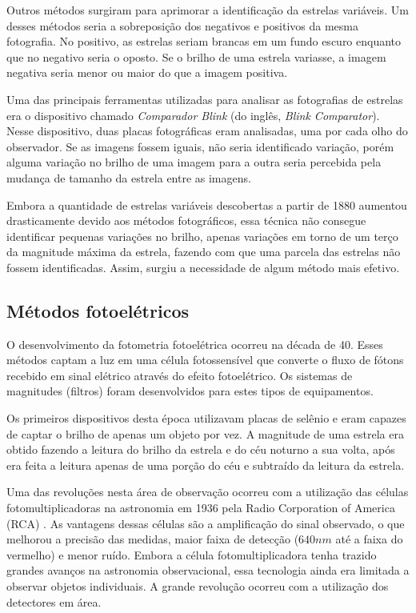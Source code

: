 Outros métodos surgiram para aprimorar a identificação da estrelas variáveis. Um desses métodos seria a sobreposição dos negativos e positivos da mesma fotografia. No positivo, as estrelas seriam brancas em um fundo escuro enquanto que no negativo seria o oposto. Se o brilho de uma estrela variasse, a imagem negativa seria menor ou maior do que a imagem positiva. 

Uma das principais ferramentas utilizadas para analisar as fotografias de estrelas era o dispositivo chamado \textit{Comparador Blink} (do inglês, \textit{Blink Comparator}). Nesse dispositivo, duas placas fotográficas eram analisadas, uma por cada olho do observador. Se as imagens fossem iguais, não seria identificado variação, porém alguma variação no brilho de uma imagem para a outra seria percebida pela mudança de tamanho da estrela entre as imagens.

Embora a quantidade de estrelas variáveis descobertas a partir de 1880 aumentou drasticamente devido aos métodos fotográficos, essa técnica não consegue identificar pequenas variações no brilho, apenas variações em torno de um terço da magnitude máxima da estrela, fazendo com que uma parcela das estrelas não fossem identificadas. Assim, surgiu a necessidade de algum método mais efetivo.


\subsection{Métodos fotoelétricos}

O desenvolvimento da fotometria fotoelétrica ocorreu na década de 40. Esses métodos captam a luz em uma célula fotossensível que converte o fluxo de fótons recebido em sinal elétrico através do efeito fotoelétrico. Os sistemas de magnitudes (filtros) foram desenvolvidos para estes tipos de equipamentos.

Os primeiros dispositivos  desta época utilizavam placas de selênio e eram capazes de captar o brilho de apenas um objeto por vez. A magnitude de uma estrela era obtido fazendo a leitura do brilho da estrela e do céu noturno a sua volta, após era feita a leitura apenas de uma porção do céu e subtraído da leitura da estrela. 

Uma das revoluções nesta área de observação ocorreu com a utilização das células fotomultiplicadoras na astronomia em 1936 pela Radio Corporation of America (RCA) \citep{Miles2007}. As vantagens dessas células são a amplificação do sinal observado, o que melhorou a precisão das medidas, maior faixa de detecção ($640 \si{nm}$ até a faixa do vermelho) e menor ruído. Embora a célula fotomultiplicadora tenha trazido grandes avanços na astronomia observacional, essa tecnologia ainda era limitada a observar objetos individuais. A grande revolução ocorreu com a utilização dos detectores em área.

